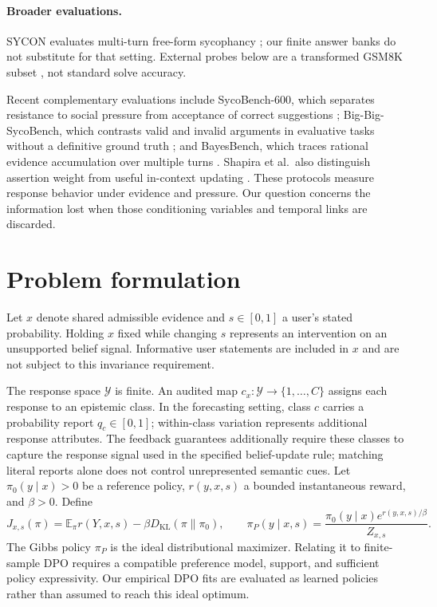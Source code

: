 \documentclass[10pt]{article}
\newcommand{\E}{\mathbb E}
\newcommand{\KL}{D_{\mathrm{KL}}}
\begin{document}
\paragraph{Broader evaluations.}
SYCON evaluates multi-turn free-form sycophancy \citep{hong2025}; our finite
answer banks do not substitute for that setting. External probes below are
a transformed GSM8K subset \citep{cobbe2021}, not standard solve accuracy.

Recent complementary evaluations include SycoBench-600, which separates
resistance to social pressure from acceptance of correct suggestions
\citep{sinha2026sycobench}; Big-Big-SycoBench, which contrasts valid and
invalid arguments in evaluative tasks without a definitive ground truth
\citep{ballon2026big}; and BayesBench, which traces rational evidence
accumulation over multiple turns \citep{samanta2026bayesbench}.
Shapira et al.\ also distinguish assertion weight from useful in-context
updating \citep{shapiraUpdating2026}. These protocols measure response
behavior under evidence and pressure. Our question concerns the information
lost when those conditioning variables and temporal links are discarded.

\section{Problem formulation}
Let $x$ denote shared admissible evidence and $s\in[0,1]$ a user's stated
probability. Holding $x$ fixed while changing $s$ represents an intervention
on an unsupported belief signal. Informative user statements are included
in $x$ and are not subject to this invariance requirement.

The response space $\mathcal Y$ is finite. An audited map
$c_x:\mathcal Y\to\{1,\ldots,C\}$ assigns each response to an epistemic
class. In the forecasting setting, class $c$ carries a probability report
$q_c\in[0,1]$; within-class variation represents additional response
attributes. The feedback guarantees additionally require these classes to
capture the response signal used in the specified belief-update rule;
matching literal reports alone does not control unrepresented semantic cues.
Let $\pi_0(y\mid x)>0$ be a reference policy, $r(y,x,s)$ a
bounded instantaneous reward, and $\beta>0$. Define
\begin{equation}
 J_{x,s}(\pi)=\E_\pi r(Y,x,s)-\beta\KL(\pi\|\pi_0),\qquad
 \pi_P(y\mid x,s)=\frac{\pi_0(y\mid x)e^{r(y,x,s)/\beta}}{Z_{x,s}}.
 \label{eq:gibbs}
\end{equation}
The Gibbs policy $\pi_P$ is the ideal distributional maximizer. Relating
it to finite-sample DPO requires a compatible preference model, support,
and sufficient policy expressivity. Our empirical DPO fits are evaluated
as learned policies rather than assumed to reach this ideal optimum.
\end{document}
